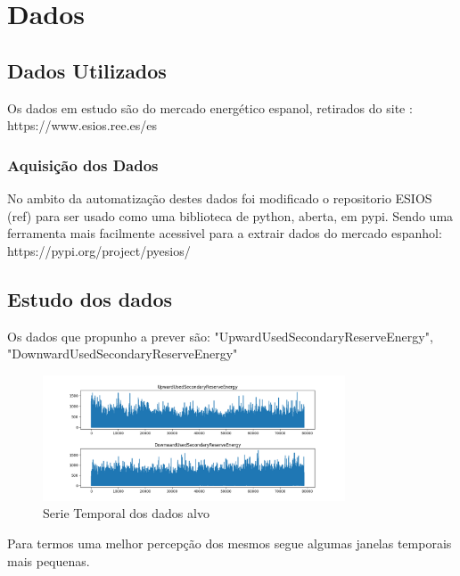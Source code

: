 \chapter{Dados}

\section{Dados Utilizados \label{se:dados_crus}}

Os dados em estudo são do mercado energético espanol, retirados do site :
https://www.esios.ree.es/es




\subsection{Aquisição dos Dados}

No ambito da automatização destes dados foi modificado o repositorio ESIOS (ref) para ser usado como uma biblioteca de python, aberta, em pypi.
Sendo uma ferramenta mais facilmente acessivel para a extrair dados do mercado espanhol:
https://pypi.org/project/pyesios/



\section{Estudo dos dados  \label{se:dados_estudo}}

Os dados que propunho a prever são: "UpwardUsedSecondaryReserveEnergy", "DownwardUsedSecondaryReserveEnergy"

\begin{figure}[H]
  \centering
  \includegraphics[width=0.8\textwidth]{../plots/targets_timeseries.png}
  \caption{Serie Temporal dos dados alvo}
  \label{fig:target_timeseries}
\end{figure}

Para termos uma melhor percepção dos mesmos segue algumas janelas temporais mais pequenas.

